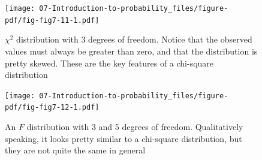 \documentclass[
  a4paper,
]{book}
\begin{document}
\begin{figure}

\texttt{[image: 07-Introduction-to-probability\_files/figure-pdf/fig-fig7-11-1.pdf]} \hfill{}

\caption{\label{fig-fig7-11}\(\chi^2\) distribution with 3 degrees of
freedom. Notice that the observed values must always be greater than
zero, and that the distribution is pretty skewed. These are the key
features of a chi-square distribution}

\end{figure}

\begin{figure}

\texttt{[image: 07-Introduction-to-probability\_files/figure-pdf/fig-fig7-12-1.pdf]} \hfill{}

\caption{\label{fig-fig7-12}An \(F\) distribution with 3 and 5 degrees
of freedom. Qualitatively speaking, it looks pretty similar to a
chi-square distribution, but they are not quite the same in general}

\end{figure}
\end{document}
